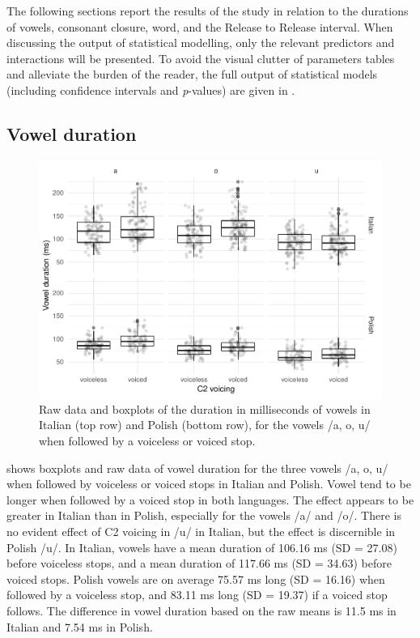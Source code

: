 \documentclass[12pt,]{article}
\begin{document}
The following sections report the results of the study in relation to
the durations of vowels, consonant closure, word, and the Release to
Release interval. When discussing the output of statistical modelling,
only the relevant predictors and interactions will be presented. To
avoid the visual clutter of parameters tables and alleviate the burden
of the reader, the full output of statistical models (including
confidence intervals and \emph{p}-values) are given in .

\hypertarget{vowel-duration}{%
\subsection{Vowel duration}\label{vowel-duration}}

\label{s:vduration}

\begin{figure}
\includegraphics[width=\linewidth]{2018-relrel_files/figure-latex/Figure2} \caption{Raw data and boxplots of the duration in milliseconds of vowels in Italian (top row) and Polish (bottom row), for the vowels /a, o, u/ when followed by a voiceless or voiced stop.}\label{f:Figure2}
\end{figure}

 shows boxplots and raw data of vowel duration for the
three vowels /a, o, u/ when followed by voiceless or voiced stops in
Italian and Polish. Vowel tend to be longer when followed by a voiced
stop in both languages. The effect appears to be greater in Italian than
in Polish, especially for the vowels /a/ and /o/. There is no evident
effect of C2 voicing in /u/ in Italian, but the effect is discernible in
Polish /u/. In Italian, vowels have a mean duration of 106.16 ms (SD =
27.08) before voiceless stops, and a mean duration of 117.66 ms (SD =
34.63) before voiced stops. Polish vowels are on average 75.57 ms long
(SD = 16.16) when followed by a voiceless stop, and 83.11 ms long (SD =
19.37) if a voiced stop follows. The difference in vowel duration based
on the raw means is 11.5 ms in Italian and 7.54 ms in Polish.
\end{document}
